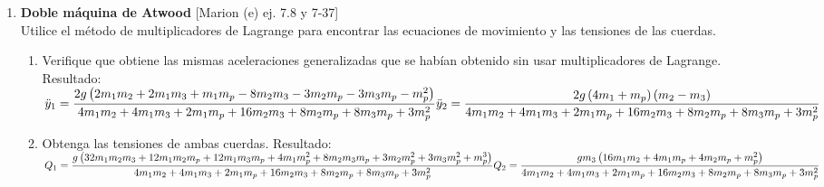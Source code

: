 \documentclass[11pt, spanish, a4paper, twoside]{article}
\begin{document}
\begin{enumerate}
	
	\item
	\begin{minipage}[t][7.5cm]{0.67\textwidth}
	\textbf{Doble máquina de Atwood} [Marion (e) ej. 7.8 y 7-37]\\
	Utilice el método de multiplicadores de Lagrange para encontrar las ecuaciones de movimiento y las tensiones de las cuerdas.
	\begin{enumerate}
		\item Verifique que obtiene las mismas aceleraciones generalizadas que se habían obtenido sin usar multiplicadores de Lagrange.
		Resultado:\\[5 pt]
		\(
			\ddot{y}_{1} = 
			\dfrac{2 g \left(2 m_{1} m_{2} + 2 m_{1} m_{3} + m_{1} m_{p} - 8 m_{2} m_{3} - 3 m_{2} m_{p} - 3 m_{3} m_{p} - m_{p}^{2}\right)}{4 m_{1} m_{2} + 4 m_{1} m_{3} + 2 m_{1} m_{p} + 16 m_{2} m_{3} + 8 m_{2} m_{p} + 8 m_{3} m_{p} + 3 m_{p}^{2}}\\[5 pt]
			\ddot{y}_{2} = 
			\dfrac{2 g \left(4 m_{1} + m_{p}\right) \left(m_{2} - m_{3}\right)}{4 m_{1} m_{2} + 4 m_{1} m_{3} + 2 m_{1} m_{p} + 16 m_{2} m_{3} + 8 m_{2} m_{p} + 8 m_{3} m_{p} + 3 m_{p}^{2}}
		\)
		\item Obtenga las tensiones de ambas cuerdas.
			Resultado:\\[5 pt]
			\(
				Q_{1} = 
				\dfrac{g \left(32 m_{1} m_{2} m_{3} + 12 m_{1} m_{2} m_{p} + 12 m_{1} m_{3} m_{p} + 4 m_{1} m_{p}^{2} + 8 m_{2} m_{3} m_{p} + 3 m_{2} m_{p}^{2} + 3 m_{3} m_{p}^{2} + m_{p}^{3}\right)}{4 m_{1} m_{2} + 4 m_{1} m_{3} + 2 m_{1} m_{p} + 16 m_{2} m_{3} + 8 m_{2} m_{p} + 8 m_{3} m_{p} + 3 m_{p}^{2}}\\[5 pt]
				Q_{2} = 
				\dfrac{g m_{3} \left(16 m_{1} m_{2} + 4 m_{1} m_{p} + 4 m_{2} m_{p} + m_{p}^{2}\right)}{4 m_{1} m_{2} + 4 m_{1} m_{3} + 2 m_{1} m_{p} + 16 m_{2} m_{3} + 8 m_{2} m_{p} + 8 m_{3} m_{p} + 3 m_{p}^{2}}
			\)
		\end{enumerate}
	\end{minipage}
	\begin{minipage}[c][2.5cm][t]{0.3\textwidth}
		
	\end{minipage}

	\newpage


\end{enumerate}
\end{document}
